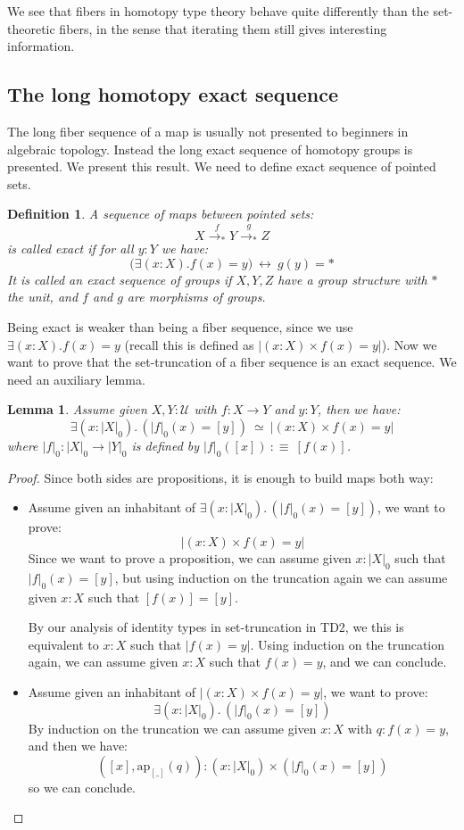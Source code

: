 \documentclass{article}
\newcommand{\sse}[1]{\medbreak \subsection{#1}}
\newcommand{\U}{{\mathcal U}}
\renewcommand{\r}{\rightarrow}
\newcommand{\ap}{\mathrm{ap}}
\newtheorem{lemma}{Lemma}
\newtheorem{definition}{Definition}
\begin{document}
We see that fibers in homotopy type theory behave quite differently than the set-theoretic fibers, in the sense that iterating them still gives interesting information.






\sse{The long homotopy exact sequence}

The long fiber sequence of a map is usually not presented to beginners in algebraic topology. Instead the long exact sequence of homotopy groups is presented. We present this result. We need to define exact sequence of pointed sets.

\begin{definition}
A sequence of maps between pointed sets:
\[X \overset{f}{\r_*} Y\overset{g}{\r_*} Z\] 
is called exact if for all $y:Y$ we have:
\[\big(\exists(x:X).f(x)=y\big) \ \leftrightarrow\ g(y)=*\]
It is called an exact sequence of groups if $X,Y,Z$ have a group structure with $*$ the unit, and $f$ and $g$ are morphisms of groups.
\end{definition}

Being exact is weaker than being a fiber sequence, since we use $\exists(x:X).f(x)=y$ (recall this is defined as $|(x:X)\times f(x)=y|$). Now we want to prove that the set-truncation of a fiber sequence is an exact sequence. We need an auxiliary lemma.

\begin{lemma}
Assume given $X,Y:\U$ with $f:X\r Y$ and $y:Y$, then we have:
\[\exists(x:|X|_0).\,(|f|_0(x) = [y]) \ \simeq\ |(x:X)\times f(x)=y|\]
where $|f|_0:|X|_0\r |Y|_0$ is defined by $|f|_0([x])\ :\equiv\ [f(x)]$.
\end{lemma}
\begin{proof}
Since both sides are propositions, it is enough to build maps both way:
\begin{itemize}
\item Assume given an inhabitant of $\exists(x:|X|_0).\,(|f|_0(x) = [y])$, we want to prove: 
\[|(x:X)\times f(x)=y|\] 
Since we want to prove a proposition, we can assume given $x:|X|_0$ such that $|f|_0(x) = [y]$, but using induction on the truncation again we can assume given $x:X$ such that $[f(x)]=[y]$. 

By our analysis of identity types in set-truncation in TD2, we this is equivalent to $x:X$ such that $|f(x)=y|$. Using induction on the truncation again, we can assume given $x:X$ such that $f(x)=y$, and we can conclude.
\item Assume given an inhabitant of $|(x:X)\times f(x)=y|$, we want to prove:
\[\exists(x:|X|_0).\,(|f|_0(x) = [y])\]
By induction on the truncation we can assume given $x:X$ with $q:f(x)=y$, and then we have:
\[([x],\ap_{[\_]}(q)) : (x:|X|_0)\times (|f|_0(x) = [y])\]
so we can conclude.
\end{itemize}
\end{proof}
\end{document}
